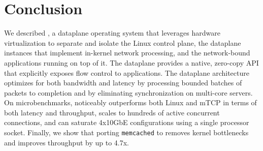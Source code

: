 
\section{Conclusion}

We described \ix, a dataplane operating system that leverages hardware
virtualization to separate and isolate the Linux control plane, the
\ix dataplane instances that implement in-kernel network processing,
and the network-bound applications running on top of it.  The \ix
dataplane provides a native, zero-copy API that explicitly exposes
flow control to applications. The dataplane architecture optimizes for
both bandwidth and latency by processing bounded batches of packets to
completion and by eliminating synchronization on multi-core
servers. On microbenchmarks, \ix noticeably outperforms both Linux and
mTCP in terms of both latency and throughput, scales to hundreds of
active concurrent connections, and can saturate 4x10GbE configurations
using a single processor socket.  Finally, we show that porting
\texttt{memcached} to \ix removes kernel bottlenecks and improves
throughput by up to 4.7x.


